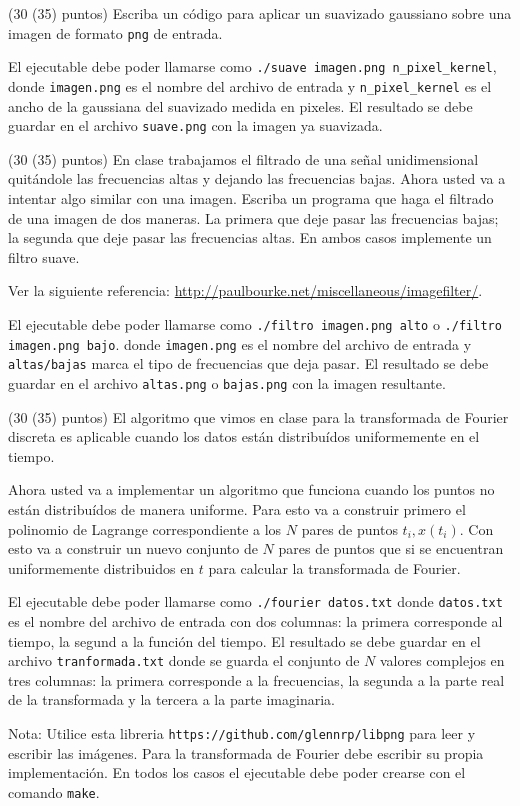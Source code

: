 \documentclass[11pt,letterpaper]{exam}
\begin{document}
\begin{questions}


(30 (35) puntos) Escriba un c\'odigo para aplicar un suavizado
gaussiano sobre una imagen de formato \verb"png" de entrada. 

El ejecutable debe poder llamarse como 
\verb"./suave imagen.png n_pixel_kernel", donde \verb"imagen.png" es
el nombre del archivo de entrada y \verb"n_pixel_kernel" es el ancho
de la gaussiana del suavizado medida en pixeles.
El resultado se debe guardar en el archivo
\verb"suave.png" con la imagen ya suavizada.



(30 (35) puntos)
En clase trabajamos el filtrado de una se\~nal unidimensional
quit\'andole las frecuencias altas y dejando las frecuencias
bajas. 
Ahora usted va a intentar algo similar con una imagen.
Escriba un programa que haga el filtrado de una imagen de
dos maneras. La primera que deje pasar las frecuencias bajas; la
segunda que deje pasar las frecuencias altas.  
En ambos casos implemente un filtro suave. 

Ver la siguiente
referencia: \url{http://paulbourke.net/miscellaneous/imagefilter/}. 


El ejecutable debe poder llamarse como 
\verb"./filtro imagen.png alto" o \verb"./filtro imagen.png bajo".
donde \verb"imagen.png" es el nombre del archivo de entrada y 
\verb"altas/bajas" marca el tipo de frecuencias que deja pasar.
El resultado se debe guardar en el archivo
\verb"altas.png"  o \verb"bajas.png" con la imagen resultante.



(30 (35) puntos)
El algoritmo que vimos en clase para la transformada de Fourier
discreta es aplicable cuando los datos est\'an distribu\'idos
uniformemente en el tiempo. 

Ahora usted va a implementar un algoritmo que funciona cuando los
puntos no est\'an distribu\'idos de manera uniforme. 
Para esto va a construir primero el polinomio de Lagrange
correspondiente a los $N$ pares de puntos ${t_i,x(t_i)}$.
Con esto va a construir un nuevo conjunto de $N$ pares de puntos que
si se encuentran uniformemente distribuidos en $t$ para calcular la
transformada de Fourier.

El ejecutable debe poder llamarse como 
\verb"./fourier datos.txt" 
donde \verb"datos.txt" es el nombre del archivo de entrada  con dos
columnas: la primera corresponde al tiempo, la segund a la funci\'on
del tiempo.
El resultado se debe guardar en el archivo
\verb"tranformada.txt" donde se guarda el conjunto de $N$ valores
complejos en tres columnas:  la primera corresponde a la frecuencias,
la segunda a la parte real de la transformada y la tercera a la parte imaginaria.



\end{questions}


Nota: Utilice esta libreria \verb"https://github.com/glennrp/libpng" para leer y escribir las
im\'agenes. 
Para la transformada de Fourier debe escribir su propia implementaci\'on.
En todos los casos el ejecutable debe poder crearse con el comando
\verb"make". 
\end{document}
